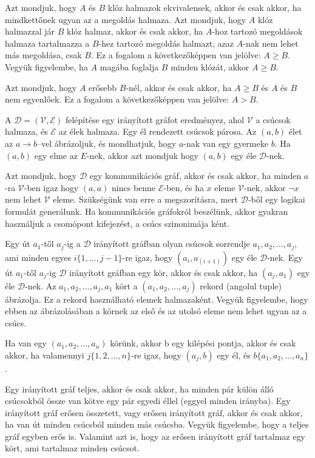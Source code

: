 \documentclass[
]{thesis-ekf}
\theoremstyle{definition}
\theoremstyle{remark}
\begin{document}
	Azt mondjuk, hogy $ A $ és $ B $ klóz halmazok ekvivalensek, akkor és csak akkor, ha mindkettőnek ugyan az a megoldás halmaza. Azt mondjuk, hogy $ A $ klóz halmazzal jár $ B $ klóz halmaz, akkor és csak akkor, ha $ A $-hoz tartozó megoldások halmaza tartalmazza a $ B $-hez tartozó megoldás halmazt, azaz $ A $-nak nem lehet más megoldása, csak $ B $. Ez a fogalom a következőképpen van jelölve: $ A\geq B $. Vegyük figyelembe, ha $ A $ magába foglalja $ B $ minden klózát, akkor $ A\geq B $.

	Azt mondjuk, hogy $ A $ erősebb $ B $-nél, akkor és csak akkor, ha $ A\geq B $ és $ A $ és $ B $ nem egyenlőek. Ez a fogalom a következőképpen van jelölve: $ A>B $.

	A $ \mathcal{D}=(\mathcal{V},\mathcal{E}) $ felépítése egy irányított gráfot eredményez, ahol $ \mathcal{V} $ a csúcsok halmaza, és $ \mathcal{E} $ az élek halmaza. Egy él rendezett csúcsok párosa. Az $ (a, b) $ élet az $ a\rightarrow b $–vel ábrázoljuk, és mondhatjuk, hogy $ a $-nak van egy gyermeke $ b $. Ha $ (a, b) $ egy elme az $ E $-nek, akkor azt mondjuk hogy $ (a, b) $ egy éle $ \mathcal{D} $-nek.
	
	Azt mondjuk, hogy $ \mathcal{D} $ egy kommunikációs gráf, akkor és csak akkor, ha minden $ a $-ra $ \mathcal{V} $-ben igaz hogy $ (a,a) $ nincs benne $ \mathcal{E} $-ben, és ha $ x $ eleme $ \mathcal{V} $-nek, akkor $ \neg x $ nem lehet $ \mathcal{V} $ eleme. Szükségünk van erre a megszorításra, mert $ \mathcal{D} $-ből egy logikai formulát generálunk. Ha kommunikációs gráfokról beszélünk, akkor gyakran használjuk a csomópont kifejezést, a csúcs szinonimája ként.

	Egy út $ a_1 $-től $ a_j $-ig a $ \mathcal{D} $ irányított gráfban olyan csúcsok sorrendje $ a_1,a_2,\dots,a_j $, ami minden egyes $ i\{1,\dots,j-1\} $-re igaz, hogy $ (a_i,a_(i+1)) $ egy éle $ \mathcal{D} $-nek. Egy út $ a_1 $-től $ a_j $-ig $ \mathcal{D} $ irányított gráfban egy kör, akkor és csak akkor, ha $ (a_j,a_1) $ egy éle $ \mathcal{D} $-nek. Az $ a_1,a_2,\dots,a_j,a_1 $ kört a $ (a_1,a_2,\dots,a_j ) $ rekord (angolul tuple) ábrázolja. Ez a rekord használható elemek halmazaként. Vegyük figyelembe, hogy ebben az ábrázolásában a körnek az első és az utolsó eleme nem lehet ugyan az a csúcs.

	Ha van egy $ (a_1,a_2,\dots,a_n) $ körünk, akkor b egy kilépési pontja, akkor és csak akkor, ha valamennyi $ j\{1,2,\dots,n\} $-re igaz, hogy $ (a_j,b) $ egy él, és $ b\{a_1,a_2,\dots,a_n\} $.

	Egy irányított gráf teljes, akkor és csak akkor, ha minden pár külön álló csúcsokból össze van kötve egy pár egyedi éllel (eggyel minden irányba). Egy irányított gráf erősen összetett, vagy erősen irányított gráf, akkor és csak akkor, ha van út minden csúcsból minden más csúcsba. Vegyük figyelembe, hogy a teljes gráf egyben erős is. Valamint azt is, hogy az erősen irányított gráf tartalmaz egy kört, ami tartalmaz minden csúcsot.
	\cite[fordítás Kusper Gábor és társainak cikkjéből]{am}
\end{document}
